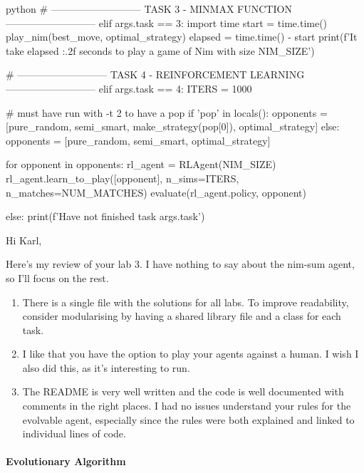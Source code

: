\begin{mintedbox}{python}
        # --------------------------- TASK 3 - MINMAX FUNCTION ---------------------------
        elif args.task == 3:
            import time
            start = time.time()
            play_nim(best_move, optimal_strategy)
            elapsed = time.time() - start
            print(f'It take {elapsed :.2f} seconds to play a game of Nim with size {NIM_SIZE}')

        # --------------------------- TASK 4 - REINFORCEMENT LEARNING ---------------------------
        elif args.task == 4:
            ITERS = 1000

            # must have run with -t 2 to have a pop
            if 'pop' in locals():
                opponents = [pure_random, semi_smart, make_strategy(pop[0]), optimal_strategy]
            else:
                opponents = [pure_random, semi_smart, optimal_strategy]

            for opponent in opponents:
                rl_agent = RLAgent(NIM_SIZE)
                rl_agent.learn_to_play([opponent], n_sims=ITERS, n_matches=NUM_MATCHES)
                evaluate(rl_agent.policy, opponent)


        else:
            print(f'Have not finished task {args.task}')
\end{mintedbox}


Hi Karl,

Here's my review of your lab 3. I have nothing to say about the nim-sum agent, so I'll focus on the rest.

\begin{enumerate}
    \item There is a single file with the solutions for all labs. To improve readability, consider modularising by having a shared library file and a class for each task.
    \item I like that you have the option to play your agents against a human. I wish I also did this, as it's interesting to run.
    \item The README is very well written and the code is well documented with comments in the right places. I had no issues understand your rules for the evolvable agent, especially since the rules were both explained and linked to individual lines of code.
\end{enumerate}

\paragraph{Evolutionary Algorithm}

